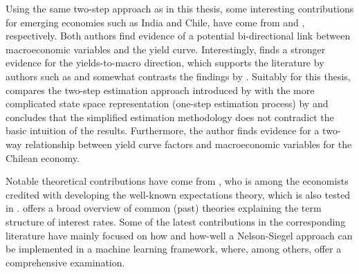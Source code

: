 Using the same two-step approach as in this thesis, some interesting contributions for emerging economies such as India and Chile, have come from \citet{kanjilal2011macroeconomic} and \citet{morales2010real}, respectively. 
Both authors find evidence of a potential bi-directional link between macroeconomic variables and the yield curve. 
Interestingly, \citet{kanjilal2011macroeconomic} finds a stronger evidence for the yields-to-macro direction, which supports the literature by authors such as \citet{estrella1991term} and somewhat contrasts the findings by \citet{diebold2006macroeconomy}. 
Suitably for this thesis, \citet{morales2010real} compares the two-step estimation approach introduced by \citet{diebold2006forecasting} with the more complicated state space representation (one-step estimation process) by \citet{diebold2006macroeconomy} and concludes that the simplified estimation methodology does not contradict the basic intuition of the results. Furthermore, the author finds evidence for a two-way relationship between yield curve factors and macroeconomic variables for the Chilean economy. 


Notable theoretical contributions have come from \citet{hicks1946value}, who is among the economists credited with developing the well-known expectations theory, which is also tested in \citet{diebold2006macroeconomy}. 
\citet{kessel1971cyclical} offers a broad overview of common (past) theories explaining the term structure of interest rates.
Some of the latest contributions in the corresponding literature have mainly focused on how and how-well a Nelson-Siegel approach can be implemented in a machine learning framework, where, among others, \citet{pedersen2019survey} offer a comprehensive examination. 